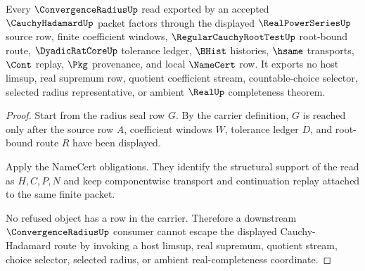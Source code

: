 \begin{theorem}
\label{thm:cauchy-hadamard-radius-nonescape}
Every $\ConvergenceRadiusUp$ read exported by an accepted $\CauchyHadamardUp$ packet factors through the displayed $\RealPowerSeriesUp$ source row, finite coefficient windows, $\RegularCauchyRootTestUp$ root-bound route, $\DyadicRatCoreUp$ tolerance ledger, $\BHist$ histories, $\hsame$ transports, $\Cont$ replay, $\Pkg$ provenance, and local $\NameCert$ row. It exports no host limsup, real supremum row, quotient coefficient stream, countable-choice selector, selected radius representative, or ambient $\RealUp$ completeness theorem.
\end{theorem}
\begin{proof}
Start from the radius seal row $G$. By the carrier definition, $G$ is reached only after the source row $A$, coefficient windows $W$, tolerance ledger $D$, and root-bound route $R$ have been displayed.

Apply the NameCert obligations. They identify the structural support of the read as $H,C,P,N$ and keep componentwise transport and continuation replay attached to the same finite packet.

No refused object has a row in the carrier. Therefore a downstream $\ConvergenceRadiusUp$ consumer cannot escape the displayed Cauchy-Hadamard route by invoking a host limsup, real supremum, quotient stream, choice selector, selected radius, or ambient real-completeness coordinate.
\end{proof}


\begin{closurestatus}{\CauchyHadamardUp}
  \theoryclosure{\scopedClosure}
  \formalstatus{\theoremCheckedV}
\end{closurestatus}
